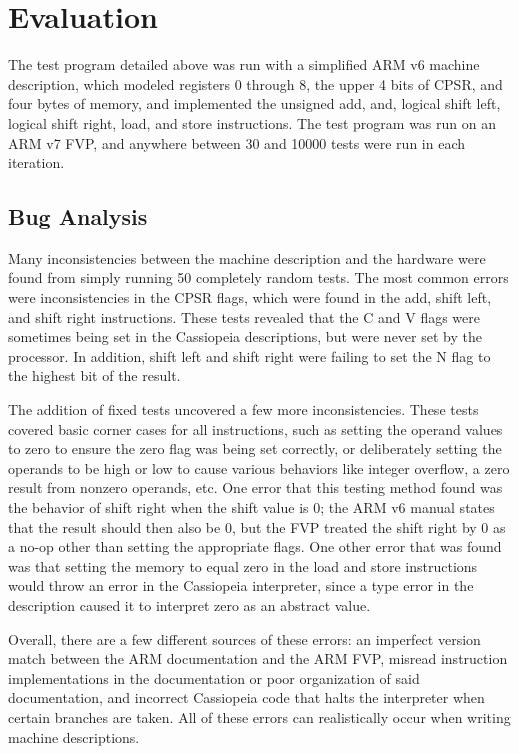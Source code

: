 \documentclass[letterpaper,12pt]{article}
\begin{document}
\section{Evaluation}

The test program detailed above was run with a simplified ARM v6 machine description, which modeled registers 0 through 8, the upper 4 bits of CPSR, and four bytes of memory, and implemented the unsigned add, and, logical shift left, logical shift right, load, and store instructions. The test program was run on an ARM v7 FVP, and anywhere between 30 and 10000 tests were run in each iteration.

\subsection{Bug Analysis}

Many inconsistencies between the machine description and the hardware were found from simply running 50 completely random tests. The most common errors were inconsistencies in the CPSR flags, which were found in the add, shift left, and shift right instructions. These tests revealed that the C and V flags were sometimes being set in the Cassiopeia descriptions, but were never set by the processor. In addition, shift left and shift right were failing to set the N flag to the highest bit of the result.

The addition of fixed tests uncovered a few more inconsistencies. These tests covered basic corner cases for all instructions, such as setting the operand values to zero to ensure the zero flag was being set correctly, or deliberately setting the operands to be high or low to cause various behaviors like integer overflow, a zero result from nonzero operands, etc. One error that this testing method found was the behavior of shift right when the shift value is 0; the ARM v6 manual states that the result should then also be 0, but the FVP treated the shift right by 0 as a no-op other than setting the appropriate flags. One other error that was found was that setting the memory to equal zero in the load and store instructions would throw an error in the Cassiopeia interpreter, since a type error in the description caused it to interpret zero as an abstract value. 

Overall, there are a few different sources of these errors: an imperfect version match between the ARM documentation and the ARM FVP, misread instruction implementations in the documentation or poor organization of said documentation, and incorrect Cassiopeia code that halts the interpreter when certain branches are taken. All of these errors can realistically occur when writing machine descriptions.
\end{document}
